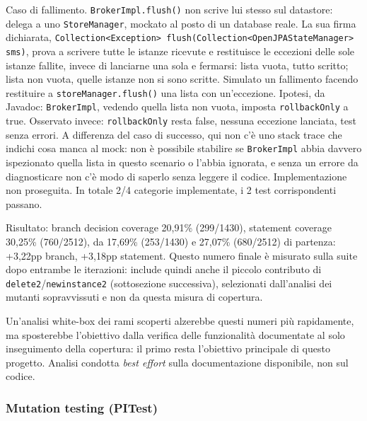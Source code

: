 Caso di fallimento. \texttt{BrokerImpl.flush()} non scrive lui stesso sul datastore: delega a uno
\texttt{StoreManager}, mockato al posto di un database reale. La sua firma dichiarata,
\texttt{Collection<Exception> flush(Collection<OpenJPAStateManager> sms)}, prova a scrivere tutte
le istanze ricevute e restituisce le eccezioni delle sole istanze fallite, invece di lanciarne una
sola e fermarsi: lista vuota, tutto scritto; lista non vuota, quelle istanze non si sono scritte.
Simulato un fallimento facendo restituire a \texttt{storeManager.flush()} una
lista con un'eccezione. Ipotesi, da Javadoc: \texttt{BrokerImpl}, vedendo quella lista non vuota,
imposta \texttt{rollbackOnly} a true. Osservato invece: \texttt{rollbackOnly} resta false, nessuna
eccezione lanciata, test senza errori. A differenza del caso di successo, qui non c'è uno stack
trace che indichi cosa manca al mock: non è possibile stabilire se \texttt{BrokerImpl} abbia davvero ispezionato
quella lista in questo scenario o l'abbia ignorata, e senza un errore da diagnosticare non c'è modo
di saperlo senza leggere il codice. Implementazione non proseguita. In totale 2/4 categorie
implementate, i 2 test corrispondenti passano.

Risultato: branch decision coverage 20,91\% (299/1430), statement coverage 30,25\% (760/2512), da
17,69\% (253/1430) e 27,07\% (680/2512) di partenza: +3,22pp branch, +3,18pp statement. Questo
numero finale è misurato sulla suite dopo entrambe le iterazioni: include quindi anche il piccolo
contributo di \texttt{delete2}/\texttt{newinstance2} (sottosezione successiva), selezionati
dall'analisi dei mutanti sopravvissuti e non da questa misura di copertura.

Un'analisi white-box dei rami scoperti alzerebbe questi numeri più rapidamente, ma sposterebbe
l'obiettivo dalla verifica delle funzionalità documentate al solo inseguimento della copertura:
il primo resta l'obiettivo principale di questo progetto. Analisi condotta \textit{best effort}
sulla documentazione disponibile, non sul codice.

\subsubsection{Mutation testing (PITest)}


